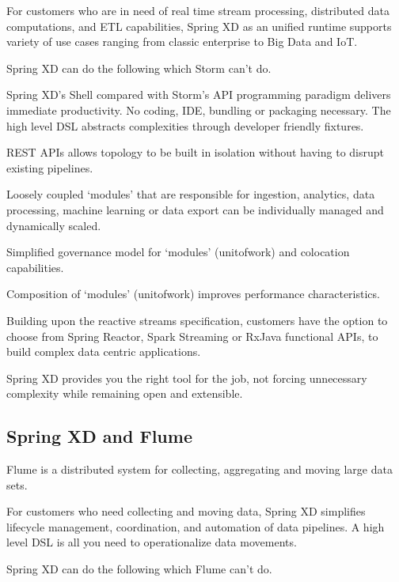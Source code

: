 For customers who are in need of real time stream processing, distributed data computations, and ETL capabilities, Spring XD as an unified runtime supports variety of use cases ranging from classic enterprise to Big Data and IoT. 

Spring XD can do the following which Storm can't do.

\begin{itemize*}
\item Spring XD's Shell compared with Storm's API programming paradigm delivers immediate productivity. No coding, IDE, bundling or packaging necessary. The high level DSL abstracts complexities through developer friendly fixtures.
\item REST APIs allows topology to be built in isolation without having to disrupt existing pipelines.
\item Loosely coupled `modules' that are responsible for ingestion, analytics, data processing, machine learning or data export can be individually managed and dynamically scaled.
\item Simplified governance model for `modules' (unit\-of\-work) and colocation capabilities.
\item Composition of `modules' (unit\-of\-work) improves performance characteristics. 
\item Building upon the reactive streams specification, customers have the option to choose from Spring Reactor, Spark Streaming or RxJava functional APIs, to build complex data centric applications.
\end{itemize*}

Spring XD provides you the right tool for the job, not forcing unnecessary complexity while remaining open and extensible.

\subsection{Spring XD and Flume}
Flume is a distributed system for collecting, aggregating and moving large data sets. 

For customers who need collecting and moving data, Spring XD simplifies lifecycle management, coordination, and automation of data pipelines. A high level DSL is all you need to operationalize data movements. 

Spring XD can do the following which Flume can't do.

